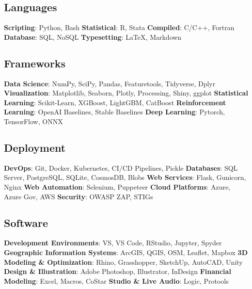 \documentclass{article}
\begin{document}
    \subsection*{Languages}
        \textbf{Scripting}: Python, Bash\newline
        \textbf{Statistical}: R, Stata\newline
        \textbf{Compiled}: C/C++, Fortran\newline
        \textbf{Database}: SQL, NoSQL\newline
        \textbf{Typesetting}: \LaTeX, Markdown
    \subsection*{Frameworks}
        \textbf{Data Science}: NumPy, SciPy, Pandas, Featuretools, Tidyverse, Dplyr\newline
        \textbf{Visualization}: Matplotlib, Seaborn, Plotly, Processing, Shiny, ggplot\newline
        \textbf{Statistical Learning}: Scikit-Learn, XGBoost, LightGBM, CatBoost\newline
        \textbf{Reinforcement Learning}: OpenAI Baselines, Stable Baselines\newline
        \textbf{Deep Learning}: Pytorch, TensorFlow, ONNX

    \subsection*{Deployment}
        \textbf{DevOps}: Git, Docker, Kubernetes, CI/CD Pipelines, Pickle\newline
        \textbf{Databases}: SQL Server, PostgreSQL, SQLite, CosmosDB, Blobs\newline
        \textbf{Web Services}: Flask, Gunicorn, Nginx\newline
        \textbf{Web Automation}: Selenium, Puppeteer\newline
        \textbf{Cloud Platforms}: Azure, Azure Gov, AWS\newline
        \textbf{Security}: OWASP ZAP, STIGs
    \subsection*{Software}
        \textbf{Development Environments}: VS, VS Code, RStudio, Jupyter, Spyder\newline
        \textbf{Geographic Information Systems}: ArcGIS, QGIS, OSM, Leaflet, Mapbox\newline
        \textbf{3D Modeling \& Optimization}: Rhino, Grasshopper, SketchUp, AutoCAD, Unity\newline
        \textbf{Design \& Illustration}: Adobe Photoshop, Illustrator, InDesign\newline
        \textbf{Financial Modeling}: Excel, Macros, CoStar\newline
        \textbf{Studio \& Live Audio}: Logic, Protools
\end{document}
